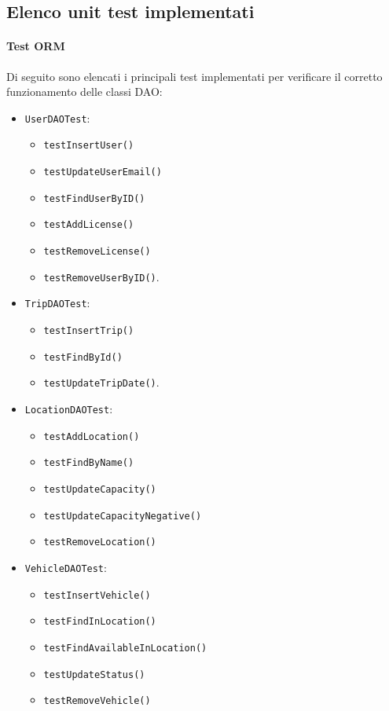 \subsection{Elenco unit test implementati}
\paragraph{Test ORM}
Di seguito sono elencati i principali test implementati per verificare il corretto funzionamento delle classi DAO:
\begin{itemize}
    \item \texttt{UserDAOTest}: 
    \begin{itemize}
        \item \texttt{testInsertUser()}
        \item \texttt{testUpdateUserEmail()} 
        \item \texttt{testFindUserByID()}
        \item \texttt{testAddLicense()}
        \item \texttt{testRemoveLicense()}
        \item \texttt{testRemoveUserByID()}.
    \end{itemize}
    
    
    \item \texttt{TripDAOTest}: 
    \begin{itemize}
        \item \texttt{testInsertTrip()}
        \item \texttt{testFindById()}
        \item \texttt{testUpdateTripDate()}.
    \end{itemize}
    
    
    \item \texttt{LocationDAOTest}: 
    \begin{itemize}
        \item \texttt{testAddLocation()}
        \item \texttt{testFindByName()}
        \item \texttt{testUpdateCapacity()}
        \item \texttt{testUpdateCapacityNegative()}
        \item \texttt{testRemoveLocation()}
    \end{itemize}
    
    \item \texttt{VehicleDAOTest}: 
    \begin{itemize}
        \item \texttt{testInsertVehicle()}
        \item \texttt{testFindInLocation()}
        \item \texttt{testFindAvailableInLocation()}
        \item \texttt{testUpdateStatus()}
        \item \texttt{testRemoveVehicle()}
    \end{itemize}
\end{itemize}

